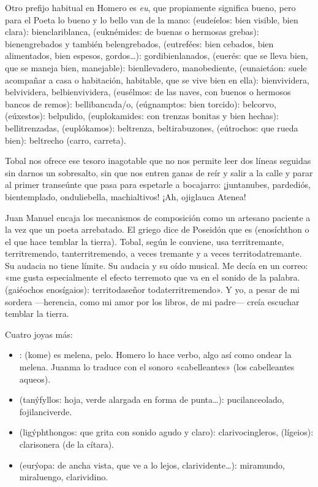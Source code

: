 Otro prefijo habitual en Homero es \emph{eu}, que propiamente significa bueno, pero para el Poeta lo bueno y lo bello van de la mano:  (eudeíelos: bien visible, bien clara): bienclariblanca,  (euknémides: de buenas o hermosas grebas): bienengrebados y también belengrebados,  (eutrefées: bien cebados, bien alimentados, bien espesos, gordos…): gordibienlanados,  (euerés: que se lleva bien, que se maneja bien, manejable): bienllevadero, manobediente,  (eunaietáon: suele acompañar a casa o habitación, habitable, que se vive bien en ella): bienvividera, belvividera, belbienvividera,  (eusélmos: de las naves, con buenos o hermosos bancos de remos): bellibancada/o,  (eúgnamptos: bien torcido): belcorvo,  (eúxestos): belpulido,  (euplokamides: con trenzas bonitas y bien hechas): bellitrenzadas,  (euplókamos): beltrenza, beltirabuzones,  (eútrochos: que rueda bien): beltrecho (carro, carreta).

Tobal nos ofrece ese tesoro inagotable que no nos permite leer dos líneas seguidas sin darnos un sobresalto, sin que nos entren ganas de reír y salir a la calle y parar al primer transeúnte que pasa para espetarle a bocajarro: ¡juntanubes, pardediós, bientemplado, onduliebella, machialtivos! ¡Ah, ojiglauca Atenea! 

Juan Manuel encaja los mecanismos de composición como un artesano paciente a la vez que un poeta arrebatado. El griego dice de Poseidón que es  (enosíchthon o el que hace temblar la tierra). Tobal, según le conviene, usa territremante, territremendo, tanterritremendo, a veces tremante y a veces territodatremante. Su audacia no tiene límite. Su audacia y su oído musical. Me decía en un correo: «me gusta especialmente el efecto terremoto que va en el sonido de la palabra.  (gaiéochos enosígaios): territodaseñor todaterritremendo». Y yo, a pesar de mi 
sordera ---herencia, como mi amor por los libros, de mi padre--- creía escuchar temblar la tierra. 

Cuatro joyas más:

\begin{itemize}
\item {}:  (kome) es melena, pelo. Homero lo hace verbo, algo así como ondear la melena. Juanma lo traduce con el sonoro «cabelleantes» (los cabelleantes aqueos).

\item {} (tanýfyllos: hoja, verde alargada en forma de punta…): pucilanceolado, fojilanciverde.

\item {} (ligýphthongos: que grita con sonido agudo y claro): clarivocingleros,  (lígeios): clarisonera (de la cítara).

\item {} (eurýopa: de ancha vista, que ve a lo lejos, clarividente…): miramundo, miraluengo, clarividino.

\end{itemize}

